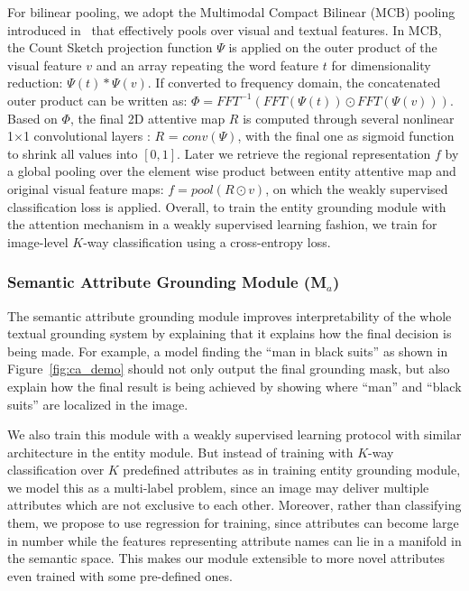 For bilinear pooling, we adopt the Multimodal Compact Bilinear (MCB) pooling introduced in~\citep{fukui2016multimodal} that effectively pools over visual and textual features. In MCB, the Count Sketch projection function \citep{charikar2002finding} $\Psi$ is applied on the outer product of the visual feature $v$ and an array repeating the word feature $t$ for dimensionality reduction: $\Psi (t)\ast \Psi(v)$. If converted to frequency domain, the concatenated outer product can be written as: $\Phi= {FFT}^{-1}(FFT(\Psi (t))\odot FFT(\Psi(v)))$. Based on $\Phi$, the final 2D attentive map $R$ is computed through several nonlinear 1$\times$1 convolutional layers : $R$ = $conv(\Psi)$, with the final one as sigmoid function to shrink all values into $[0,1]$. Later we retrieve the regional representation $f$ by a global pooling over the element wise product between entity attentive map and original visual feature maps: $f = pool(R\odot v)$, on which the weakly supervised classification loss is applied.
Overall, to train the entity grounding module with the attention mechanism in a weakly supervised learning fashion,
we train for image-level $K$-way classification using a cross-entropy loss.



\subsubsection{Semantic Attribute Grounding Module (M$_{a}$)}
The semantic attribute grounding module improves interpretability of the whole textual
grounding system by explaining that it explains how the final decision is being made. For example, a model finding the ``man in black suits'' as shown in Figure~\ref{fig:ca_demo} should not only output the final grounding mask, but also explain how the final result is being achieved by showing where ``man'' and ``black suits'' are localized in the image.

We also train this module with a weakly supervised learning protocol with similar architecture in the entity module.
But instead of training with $K$-way classification over $K$ predefined attributes as in training entity grounding module, we model this as a multi-label problem, since an image may deliver multiple attributes which are not exclusive to each other. Moreover, rather than classifying them, we propose to use regression for training, since attributes can become large in number while the features representing attribute names can lie in a manifold in the semantic space. This makes our module extensible to more novel attributes even trained with some pre-defined ones.

